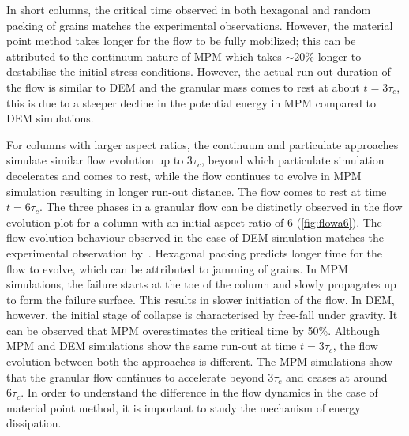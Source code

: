 In short columns, the critical time observed in both hexagonal and random 
packing of grains matches the experimental observations. However, the material 
point method takes longer for the flow to be fully mobilized; this can be 
attributed to the continuum nature of MPM which takes $\sim20\%$ longer to 
destabilise the initial stress conditions. However, the actual run-out duration 
of the flow is similar to DEM and the granular mass comes to rest at about 
$\textit{t}=3\tau_{c}$, this is due to a steeper decline in the potential 
energy in MPM compared to DEM simulations.
 
For columns with larger aspect ratios, the continuum and particulate approaches 
simulate similar flow evolution up to 3$\tau_{c}$, beyond 
which particulate simulation decelerates and comes to rest, while the flow 
continues to evolve in MPM simulation resulting in longer run-out distance. 
The flow comes to rest at time $\textit{t}=6\tau_{c}$. The 
three phases in a granular flow can be distinctly observed in the flow 
evolution plot for a column with an initial aspect ratio of 6 
(\cref{fig:flowa6}). The flow evolution 
behaviour observed in the case of DEM simulation matches the experimental 
observation by~\citet{Lajeunesse2004}. Hexagonal packing predicts longer time 
for the flow to evolve, which can be attributed to jamming of grains. 
In MPM simulations, the failure starts at the toe of the column and slowly 
propagates up to form the failure surface. This results in slower initiation of 
the flow. In DEM, however, the initial stage of collapse is characterised by 
free-fall under gravity. It can be observed that MPM overestimates the critical 
time by 50\%. Although MPM and DEM simulations show the same run-out at time 
$\textit{t}=3\tau_{c}$, the flow evolution between both the approaches is 
different. The MPM simulations show that the granular flow continues to 
accelerate beyond $3\tau_c$ and ceases at around $6\tau_{c}$. In order to 
understand the difference in the flow dynamics in the case of material point 
method, it is important to study the mechanism of energy dissipation. 


